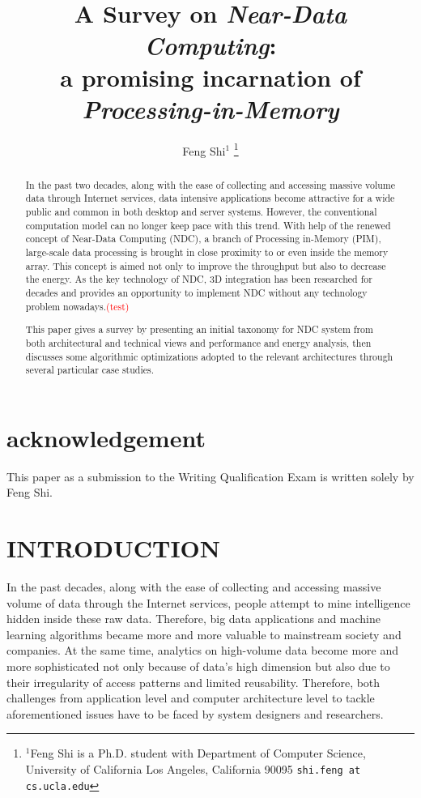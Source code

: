 \documentclass[letterpaper, 11pt, conference, margin=1in]{ieeeconf}   %
\title{\LARGE \bf
A Survey on \textit{Near-Data Computing}: \\ a promising incarnation of \textit{Processing-in-Memory}
}
\author{Feng Shi$^{1}$ %
\thanks{$^{1}$Feng Shi is a Ph.D. student with Department of Computer Science,
        University of California Los Angeles, California 90095
        {\tt\small shi.feng at cs.ucla.edu} }%
}
\newcommand\myworries[1]{\textcolor{red}{(#1)}}
\begin{document}
\maketitle
\thispagestyle{empty}
\pagestyle{empty}

\begin{abstract}
In the past two decades, along with the ease of collecting and accessing massive volume data through Internet services, data intensive applications become attractive for a wide public and common in both desktop and server systems. However, the conventional computation model can no longer keep pace with this trend. With help of the renewed concept of Near-Data Computing (NDC), a branch of Processing in-Memory (PIM), large-scale data processing is brought in close proximity to or even inside the memory array. This concept is aimed not only to improve the throughput but also to decrease the energy. As the key technology of NDC, 3D integration has been researched for decades and provides an opportunity to implement NDC without any technology problem nowadays.\myworries{test}

This paper gives a survey by presenting an initial taxonomy for NDC system from both architectural and technical views and performance and energy analysis, then discusses some algorithmic optimizations adopted to the relevant architectures through several particular case studies.
\end{abstract}


\section*{\textbf{acknowledgement}}
This paper as a submission to the Writing Qualification Exam is written solely by Feng Shi.

\section{INTRODUCTION}
In the past decades, along with the ease of collecting and accessing massive volume of data through the Internet services, people attempt to mine intelligence hidden inside these raw data. Therefore, big data applications and machine learning algorithms became more and more valuable to mainstream society and companies. At the same time, analytics on high-volume data become more and more sophisticated not only because of data's high dimension but also due to their irregularity of access patterns and limited reusability. Therefore, both challenges from application level and computer architecture level to tackle aforementioned issues have to be faced by system designers and researchers.
\end{document}
